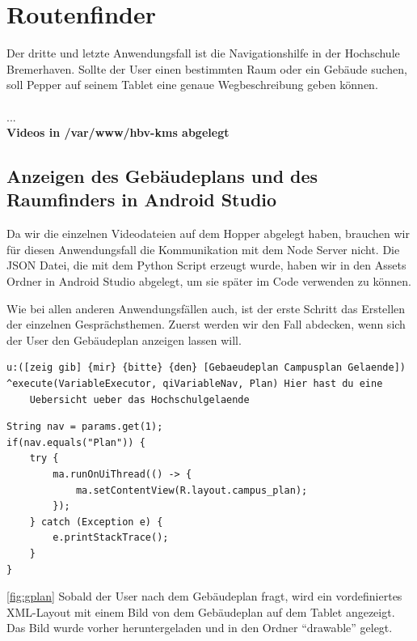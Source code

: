 \section{Routenfinder}

Der dritte und letzte Anwendungsfall ist die Navigationshilfe in der Hochschule Bremerhaven. Sollte der User einen bestimmten Raum oder ein 
Gebäude suchen, soll Pepper auf seinem Tablet eine genaue Wegbeschreibung geben können. 
\\\\
...
\\
\textbf{Videos in /var/www/hbv-kms abgelegt}
\\


\subsection{Anzeigen des Gebäudeplans und des Raumfinders in Android Studio}

Da wir die einzelnen Videodateien auf dem Hopper abgelegt haben, brauchen wir für diesen Anwendungsfall die Kommunikation mit dem Node Server nicht. 
Die JSON Datei, die mit dem Python Script erzeugt wurde, haben wir in den Assets Ordner in Android Studio abgelegt, um sie später im Code verwenden zu können. 

Wie bei allen anderen Anwendungsfällen auch, ist der erste Schritt das Erstellen der einzelnen Gesprächsthemen. 
Zuerst werden wir den Fall abdecken, wenn sich der User den Gebäudeplan anzeigen lassen will.

\begin{lstlisting}
u:([zeig gib] {mir} {bitte} {den} [Gebaeudeplan Campusplan Gelaende])
^execute(VariableExecutor, qiVariableNav, Plan) Hier hast du eine 
    Uebersicht ueber das Hochschulgelaende
\end{lstlisting}


\begin{lstlisting}
String nav = params.get(1);
if(nav.equals("Plan")) {
    try {
        ma.runOnUiThread(() -> {
            ma.setContentView(R.layout.campus_plan);
        });
    } catch (Exception e) {
        e.printStackTrace();
    }
}
\end{lstlisting}

\ref{fig:gplan} Sobald der User nach dem Gebäudeplan fragt, wird ein vordefiniertes XML-Layout mit einem Bild von dem 
Gebäudeplan auf dem Tablet angezeigt. Das Bild wurde vorher heruntergeladen und in den Ordner 
``drawable'' gelegt.

